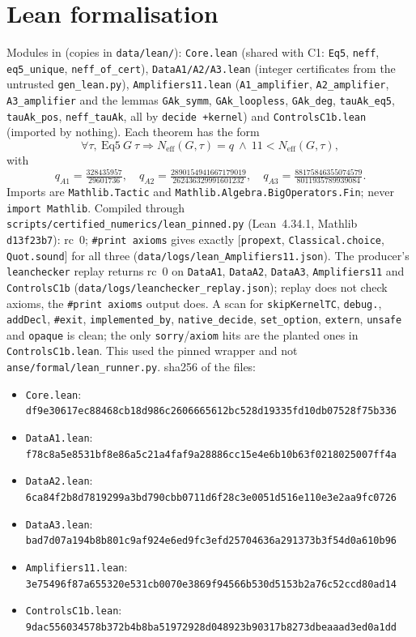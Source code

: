 \documentclass[10pt]{article}
\newcommand{\lean}[1]{\texttt{#1}}
\newcommand{\Neff}{N_{\mathrm{eff}}}
\begin{document}
\section{Lean formalisation}\label{sec:lean}
Modules in  (copies in \texttt{data/lean/}): \texttt{Core.lean} (shared with C1: \lean{Eq5}, \lean{neff}, \lean{eq5\_unique}, \lean{neff\_of\_cert}), \texttt{DataA1/A2/A3.lean} (integer certificates from the untrusted \texttt{gen\_lean.py}), \texttt{Amplifiers11.lean} (\lean{A1\_amplifier}, \lean{A2\_amplifier}, \lean{A3\_amplifier} and the lemmas \lean{GAk\_symm}, \lean{GAk\_loopless}, \lean{GAk\_deg}, \lean{tauAk\_eq5}, \lean{tauAk\_pos}, \lean{neff\_tauAk}, all by \lean{decide +kernel}) and \texttt{ControlsC1b.lean} (imported by nothing). Each theorem has the form
\[\forall\tau,\ \text{Eq5}\ G\ \tau\Rightarrow \Neff(G,\tau)=q\ \wedge\ 11<\Neff(G,\tau),\]
with
\[q_{A1}=\tfrac{328435957}{29601736},\quad q_{A2}=\tfrac{2890154941667179019}{262436329991601232},\quad q_{A3}=\tfrac{88175846355074579}{8011935789939084}.\]
Imports are \lean{Mathlib.Tactic} and \lean{Mathlib.Algebra.BigOperators.Fin}; never \lean{import Mathlib}. Compiled through \texttt{scripts/certified\_numerics/lean\_pinned.py} (Lean~4.34.1, Mathlib \texttt{d13f23b7}): rc~$0$; \lean{\#print axioms} gives exactly $[$\lean{propext}, \lean{Classical.choice}, \lean{Quot.sound}$]$ for all three (\texttt{data/logs/lean\_Amplifiers11.json}). The producer's \texttt{leanchecker} replay returns rc~$0$ on \lean{DataA1}, \lean{DataA2}, \lean{DataA3}, \lean{Amplifiers11} and \lean{ControlsC1b} (\texttt{data/logs/leanchecker\_replay.json}); replay does not check axioms, the \lean{\#print axioms} output does. A scan for \lean{skipKernelTC}, \lean{debug.}, \lean{addDecl}, \lean{\#exit}, \lean{implemented\_by}, \lean{native\_decide}, \lean{set\_option}, \lean{extern}, \lean{unsafe} and \lean{opaque} is clean; the only \lean{sorry}/\lean{axiom} hits are the planted ones in \texttt{ControlsC1b.lean}. This used the pinned wrapper and not \texttt{anse/formal/lean\_runner.py}. sha256 of the files:
\begin{itemize}\scriptsize\itemsep=0pt
\item \texttt{Core.lean}: \texttt{df9e30617ec88468cb18d986c2606665612bc528d19335fd10db07528f75b336}
\item \texttt{DataA1.lean}: \texttt{f78c8a5e8531bf8e86a5c21a4faf9a28886cc15e4e6b10b63f0218025007ff4a}
\item \texttt{DataA2.lean}: \texttt{6ca84f2b8d7819299a3bd790cbb0711d6f28c3e0051d516e110e3e2aa9fc0726}
\item \texttt{DataA3.lean}: \texttt{bad7d07a194b8b801c9af924e6ed9fc3efd25704636a291373b3f54d0a610b96}
\item \texttt{Amplifiers11.lean}: \texttt{3e75496f87a655320e531cb0070e3869f94566b530d5153b2a76c52ccd80ad14}
\item \texttt{ControlsC1b.lean}: \texttt{9dac556034578b372b4b8ba51972928d048923b90317b8273dbeaaad3ed0a1dd}
\end{itemize}
\end{document}
